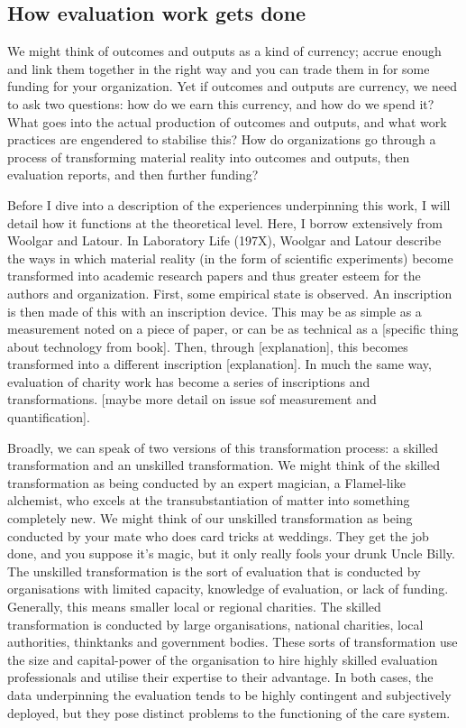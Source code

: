 \subsection{How evaluation work gets done}
We might think of outcomes and outputs as a kind of currency; accrue enough and link them together in the right way and you can trade them in for some funding for your organization. Yet if outcomes and outputs are currency, we need to ask two questions: how do we earn this currency, and how do we spend it? What goes into the actual production of outcomes and outputs, and what work practices are engendered to stabilise this? How do organizations go through a process of transforming material reality into outcomes and outputs, then evaluation reports, and then further funding?

Before I dive into a description of the experiences underpinning this work, I will detail how it functions at the theoretical level. Here, I borrow extensively from Woolgar and Latour. In Laboratory Life (197X), Woolgar and Latour describe the ways in which material reality (in the form of scientific experiments) become transformed into academic research papers and thus greater esteem for the authors and organization. First, some empirical state is observed. An inscription is then made of this with an inscription device. This may be as simple as a measurement noted on a piece of paper, or can be as technical as a [specific thing about technology from book]. Then, through [explanation], this becomes transformed into a different inscription [explanation]. In much the same way, evaluation of charity work has become a series of inscriptions and transformations. [maybe more detail on issue sof measurement and quantification].

Broadly, we can speak of two versions of this transformation process: a skilled transformation and an unskilled transformation. We might think of the skilled transformation as being conducted by an expert magician, a Flamel-like alchemist, who excels at the transubstantiation of matter into something completely new. We might think of our unskilled transformation as being conducted by your mate who does card tricks at weddings. They get the job done, and you suppose it's magic, but it only really fools your drunk Uncle Billy. The unskilled transformation is the sort of evaluation that is conducted by organisations with limited capacity, knowledge of evaluation, or lack of funding. Generally, this means smaller local or regional charities. The skilled transformation is conducted by large organisations, national charities, local authorities, thinktanks and government bodies. These sorts of transformation use the size and capital-power of the organisation to hire highly skilled evaluation professionals and utilise their expertise to their advantage. In both cases, the data underpinning the evaluation tends to be highly contingent and subjectively deployed, but they pose distinct problems to the functioning of the care system.


